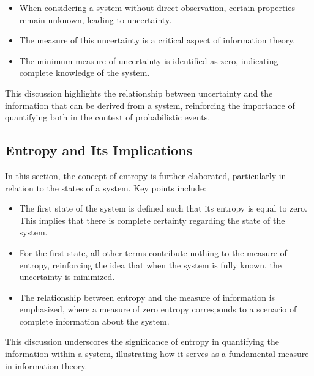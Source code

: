 \documentclass[a4paper]{article}
\begin{document}
\begin{itemize}
    \item When considering a system without direct observation, certain properties remain unknown, leading to uncertainty.
    \item The measure of this uncertainty is a critical aspect of information theory.
    \item The minimum measure of uncertainty is identified as zero, indicating complete knowledge of the system.
\end{itemize}

This discussion highlights the relationship between uncertainty and the information that can be derived from a system, reinforcing the importance of quantifying both in the context of probabilistic events.

\subsection{Entropy and Its Implications}
In this section, the concept of entropy is further elaborated, particularly in relation to the states of a system. Key points include:

\begin{itemize}
    \item The first state of the system is defined such that its entropy is equal to zero. This implies that there is complete certainty regarding the state of the system.
    \item For the first state, all other terms contribute nothing to the measure of entropy, reinforcing the idea that when the system is fully known, the uncertainty is minimized.
    \item The relationship between entropy and the measure of information is emphasized, where a measure of zero entropy corresponds to a scenario of complete information about the system.
\end{itemize}

This discussion underscores the significance of entropy in quantifying the information within a system, illustrating how it serves as a fundamental measure in information theory.
\end{document}
